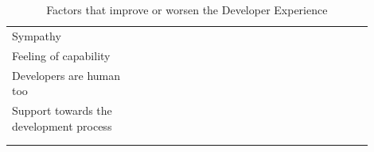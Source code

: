 \documentclass[english, 12pt, a4paper, sci, utf8, a-1b, online]{aaltothesis}
\begin{document}
{\begin{center}
\begin{longtable}{p{0.3\linewidth}p{0.6\linewidth}}
      Sympathy                                & \textcite{contributing-as-a-designer}                                                                                                                                                                                                                                                                                        \\
      Feeling of capability                   & \textcite{what-is-developer-experience-everydeveloper} \newline \textcite{developer-experience-sanity}                                                                                                                                                                                                                       \\
      Developers are human too                & \textcite{api-developer-experience-dx-resources} \newline \textcite{apis-for-humans-the-rise-of-developer-experience}                                                                                                                                                                                                        \\
      Support towards the development process & \textcite{effective-developer-experience} \newline \textcite{developer-experience-what-and-why}                                                                                                                                                                                                                              \\
      \captionsetup{width=0.6\textwidth}                                                                                                                                                                                                                                                                                                                                     \\
      \caption{Factors that improve or worsen the Developer Experience}                                                                                                                                                                                                                                                                                                      \\
    \end{longtable}
  \end{center}
  \renewcommand{\arraystretch}{1}
}
\end{document}

